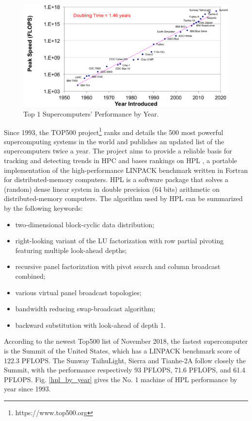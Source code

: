 \begin{figure}[htbp]
	\centering
	\includegraphics[width=0.99\linewidth]{fig/sc_evaluate.pdf}
	\caption{Top 1 Supercomputers' Performance by Year.}
	\label{sc_evaluate}
\end{figure}


Since 1993, the TOP500 project\footnote{https://www.top500.org} ranks and details the 500 most powerful supercomputing systems in the world and publishes an updated list of the supercomputers twice a year. The project aims to provide a reliable basis for tracking and detecting trends in HPC and bases rankings on HPL \cite{dongarra2003linpack}, a portable implementation of the high-performance LINPACK benchmark written in Fortran for distributed-memory computers. HPL is a software package that solves a (random) dense linear system in double precision (64 bits) arithmetic on distributed-memory computers. The algorithm used by HPL can be summarized by the following keywords: 
\begin{itemize}
	\item two-dimensional block-cyclic data distribution;
	\item right-looking variant of the LU factorization with row partial pivoting featuring multiple look-ahead depths;
	\item recursive panel factorization with pivot search and column broadcast combined;
	\item various virtual panel broadcast topologies;
	\item bandwidth reducing swap-broadcast algorithm;
	\item backward substitution with look-ahead of depth 1.
\end{itemize}

According to the newest Top500 list of November 2018, the fastest supercomputer is the Summit of the United States, which has a LINPACK benchmark score of 122.3 PFLOPS. The Sunway TaihuLight, Sierra and Tianhe-2A follow closely the Summit, with the performance respectively 93 PFLOPS, 71.6 PFLOPS, and 61.4 PFLOPS. Fig. \ref{hpl_by_year} gives the No. 1 machine of HPL performance by year since 1993.


